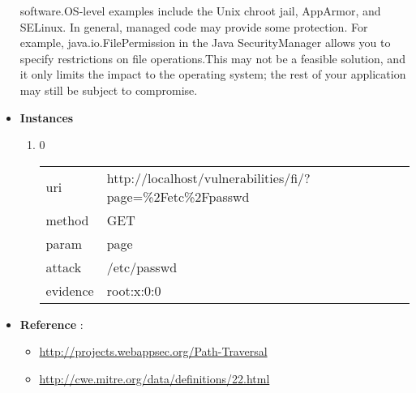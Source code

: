 \documentclass[10pt]{article}
\begin{document}
\begin{itemize}
software.OS-level examples include the Unix chroot jail, AppArmor, and SELinux. In general, managed code may provide some protection. For example, java.io.FilePermission in the Java SecurityManager allows you to specify restrictions on file operations.This may not be a feasible solution, and it only limits the impact to the operating system; the rest of your application may still be subject to compromise.
\item[] \textbf{Instances}
\begin{enumerate}
\item[] 0
\begin{tabular}{| l | p{12cm}}
uri & http://localhost/vulnerabilities/fi/?page=\%2Fetc\%2Fpasswd \\
method & GET \\
param & page \\
attack & /etc/passwd \\
evidence & root:x:0:0 \\
\end{tabular}
\end{enumerate}
\item[] \textbf{Reference} : 
\begin{itemize}
\item \url{http://projects.webappsec.org/Path-Traversal}
\item \url{http://cwe.mitre.org/data/definitions/22.html}
\end{itemize}
\end{itemize}
\end{document}
